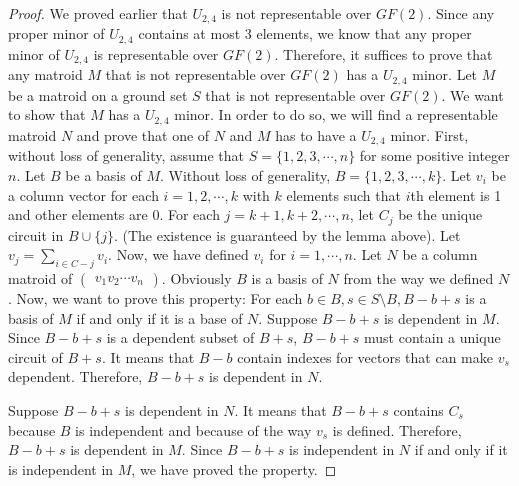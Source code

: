 \begin{proof}
We proved earlier that $U_{2, 4}$ is not representable over $GF(2)$.
Since any proper minor of $U_{2, 4}$ contains at most 3 elements, we know that any proper minor of $U_{2, 4}$ is representable over $GF(2)$.
Therefore, it suffices to prove that any matroid $M$ that is not representable over $GF(2)$ has a $U_{2, 4}$ minor.
Let $M$ be a matroid on a ground set $S$ that is not representable over $GF(2)$.
We want to show that $M$ has a $U_{2, 4}$ minor.
In order to do so, we will find a representable matroid $N$ and prove that one of $N$ and $M$ has to have a $U_{2, 4}$ minor.
First, without loss of generality, assume that $S = \{1, 2, 3, \cdots, n\}$ for some positive integer $n$.
Let $B$ be a basis of $M$.
Without loss of generality, $B = \{1, 2, 3, \cdots, k\}$.
Let $v_i$ be a column vector for each $i = 1, 2, \cdots, k$ with $k$ elements such that $i$th element is 1 and other elements are 0.
For each $j = k + 1, k + 2, \cdots, n$, let $C_j$ be the unique circuit in $B \cup \{ j \}$. 
(The existence is guaranteed by the lemma above).
Let $\displaystyle v_j = \sum_{i \in C - j } v_i$.
Now, we have defined $v_i$ for $i = 1, \cdots, n$.
Let $N$ be a column matroid of $\begin{pmatrix} v_1 v_2 \cdots v_n \end{pmatrix}$.
Obviously $B$ is a basis of $N$ from the way we defined $N$.
Now, we want to prove this property: For each $b \in B, s \in S \setminus B, B - b + s$ is a basis of $M$ if and only if it is a base of $N$.
Suppose $B - b + s$ is dependent in $M$.
Since $B - b + s$ is a dependent subset of $B + s$, $B - b + s$ must contain a unique circuit of $B + s$.
It means that $B - b$ contain indexes for vectors that can make $v_s$ dependent.
Therefore, $B - b + s$ is dependent in $N$.

Suppose $B - b + s$ is dependent in $N$.
It means that $B - b + s$ contains $C_s$ because $B$ is independent and because of the way $v_s$ is defined.
Therefore, $B - b + s$ is dependent in $M$.
% 
% 
% 
Since $B - b + s$ is independent in $N$ if and only if it is independent in $M$, we have proved the property.


\end{proof}
